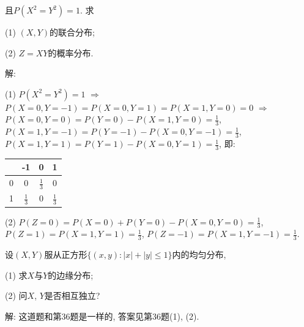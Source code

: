 \documentclass[standard]{ExBook}
\begin{document}
\begin{qitems}
\begin{bbox}
\begin{shaded}
且$P(X^2=Y^2)=1$. 求

(1) $(X,Y)$的联合分布;

(2) $Z=XY$的概率分布.
    \end{shaded}
    \end{bbox}

\vspace{-5em}

    \begin{bbox}
解: 

(1) $P(X^2=Y^2)=1$ $\Longrightarrow$ $P(X=0,Y=-1)=P(X=0,Y=1)=P(X=1,Y=0)=0$ $\Longrightarrow$ $P(X=0,Y=0)=P(Y=0)-P(X=1,Y=0)=\frac{1}{3}$, $P(X=1,Y=-1)=P(Y=-1)-P(X=0,Y=-1)=\frac{1}{3}$, $P(X=1,Y=1)=P(Y=1)-P(X=0,Y=1)=\frac{1}{3}$, 即:
    \end{bbox}

\vspace{-5em}

    \begin{bbox}
\begin{center}
    \renewcommand{\arraystretch}{1.4}
    \setlength{\tabcolsep}{12pt}
    \begin{tabular}{c|c|c|c}
	    \hline
	    \diagbox{$X$}{$P(X,Y)$}{$Y$} & -1 & 0 & 1\\
	    \hline
	    0 & 0 & $\displaystyle\frac{1}{3}$ & 0\\
	    \hline
	    1 & $\displaystyle\frac{1}{3}$ & 0 & $\displaystyle\frac{1}{3}$\\
	    \hline
    \end{tabular}
\end{center}
(2) $P(Z=0)=P(X=0)+P(Y=0)-P(X=0,Y=0)=\displaystyle\frac{1}{3}$, $P(Z=1)=P(X=1,Y=1)=\displaystyle\frac{1}{3}$, $P(Z=-1)=P(X=1,Y=-1)=\displaystyle\frac{1}{3}$.
    \end{bbox}

\vspace{-5em}

    \begin{bbox}
    \begin{shaded}
        \qitem
设$(X,Y)$服从正方形$\{(x,y):|x|+|y|\leq 1\}$内的均匀分布,

(1) 求$X$与$Y$的边缘分布;

(2) 问$X$, $Y$是否相互独立?
    \end{shaded}
    \end{bbox}

\vspace{-5em}

    \begin{bbox}
解: 这道题和第36题是一样的, 答案见第36题(1), (2).
    \end{bbox}


\end{qitems}
\end{document}
